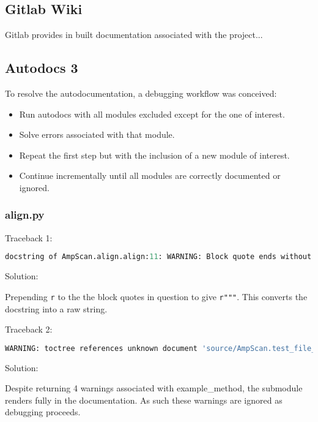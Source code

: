 \documentclass{article}
\begin{document}
\subsection{Gitlab Wiki}
Gitlab provides in built documentation associated with the project...

\subsection{Autodocs 3}
To resolve the autodocumentation, a debugging workflow was conceived:

\begin{itemize}
	\item
	Run autodocs with all modules excluded except for the one of interest.
	\item
	Solve errors associated with that module.
	\item
	Repeat the first step but with the inclusion of a new module of interest.
	\item
	Continue incrementally until all modules are correctly documented or ignored.

\end{itemize}

\subsubsection{align.py}

Traceback 1:

\begin{lstlisting}[language=Python]
docstring of AmpScan.align.align:11: WARNING: Block quote ends without a blank line; unexpected unindent.
\end{lstlisting}

Solution:

	Prepending \lstinline{r} to the the block quotes in question to give \lstinline{r"""}. This converts the docstring into a raw string.


Traceback 2:

\begin{lstlisting}[language=Python]
WARNING: toctree references unknown document 'source/AmpScan.test_file_2.ExampleClass.example_method
\end{lstlisting}

Solution:

Despite returning 4 warnings associated with example\_method, the submodule renders fully in the documentation. As such these warnings are ignored as debugging proceeds.
\end{document}
